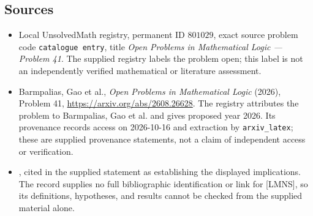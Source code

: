 \documentclass[11pt]{article}
\begin{document}
\subsection{Sources}
\begin{itemize}
\item Local UnsolvedMath registry, permanent ID \(801029\), exact source problem code \texttt{catalogue entry}, title \emph{Open Problems in Mathematical Logic --- Problem 41}. The supplied registry labels the problem open; this label is not an independently verified mathematical or literature assessment.
\item Barmpalias, Gao et al., \emph{Open Problems in Mathematical Logic} (2026), Problem 41, \url{https://arxiv.org/abs/2608.26628}. The registry attributes the problem to Barmpalias, Gao et al. and gives proposed year 2026. Its provenance records access on 2026-10-16 and extraction by \texttt{arxiv\_latex}; these are supplied provenance statements, not a claim of independent access or verification.
\item [LMNS, Section 3.1], cited in the supplied statement as establishing the displayed implications. The record supplies no full bibliographic identification or link for [LMNS], so its definitions, hypotheses, and results cannot be checked from the supplied material alone.
\end{itemize}
\end{document}
